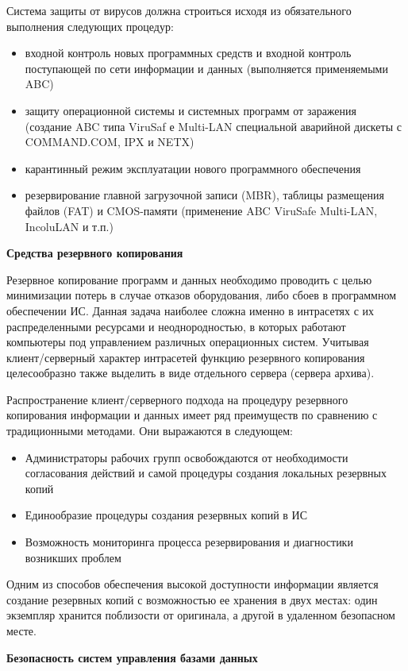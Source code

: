 Система защиты от вирусов должна строиться исходя из обязательного выполнения следующих процедур:
\begin{itemize}
    \item входной контроль новых программных средств и входной контроль поступающей по сети информации и данных (выполняется применяемыми ABC)
    \item защиту операционной системы и системных программ от заражения (создание ABC типа ViruSaf е Multi-LAN специальной аварийной дискеты с COMMAND.COM, IPX и NETX)
    \item карантинный режим эксплуатации нового программного обеспечения
    \item резервирование главной загрузочной записи (MBR), таблицы размещения файлов (FAT) и CMOS-памяти (применение ABC ViruSafe Multi-LAN, IncoluLAN и т.п.)
\end{itemize}

\bigbreak
\textbf{Средства резервного копирования}

Резервное копирование программ и данных необходимо проводить с целью минимизации потерь в случае отказов оборудования, либо сбоев в программном обеспечении ИС. Данная задача наиболее сложна именно в интрасетях с их распределенными ресурсами и неоднородностью, в которых работают компьютеры под управлением различных операционных систем. Учитывая клиент/серверный характер интрасетей функцию резервного копирования целесообразно также выделить в виде отдельного сервера (сервера архива).

Распространение клиент/серверного подхода на процедуру резервного копирования информации и данных имеет ряд преимуществ по сравнению с традиционными методами. Они выражаются в следующем:
\begin{itemize}
    \item Администраторы рабочих групп освобождаются от необходимости согласования действий и самой процедуры создания локальных резервных копий
    \item Единообразие процедуры создания резервных копий в ИС
    \item Возможность мониторинга процесса резервирования и диагностики возникших проблем
\end{itemize}

Одним из способов обеспечения высокой доступности информации является создание резервных копий с возможностью ее хранения в двух местах: один экземпляр хранится поблизости от оригинала, а другой в удаленном безопасном месте.

\bigbreak
\textbf{Безопасность систем управления базами данных}

